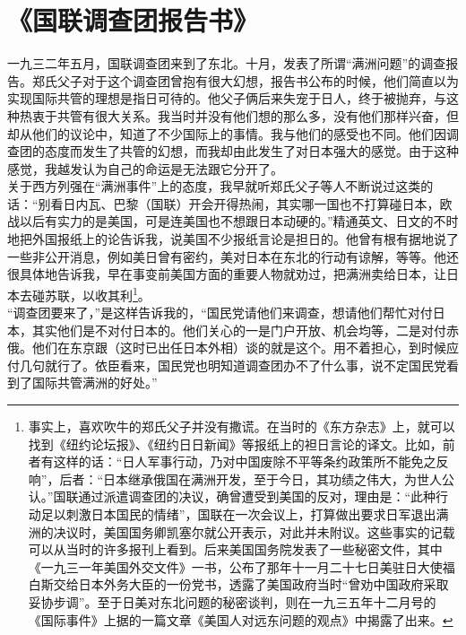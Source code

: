 \fancyhead[RO]{} %
\fancyhead[LE]{} %
\chapter*{《国联调查团报告书》}
\thispagestyle{empty}
一九三二年五月，国联调查团来到了东北。十月，发表了所谓“满洲问题”的调查报告。郑氏父子对于这个调查团曾抱有很大幻想，报告书公布的时候，他们简直以为实现国际共管的理想是指日可待的。他父子俩后来失宠于日人，终于被抛弃，与这种热衷于共管有很大关系。我当时并没有他们想的那么多，没有他们那样兴奋，但却从他们的议论中，知道了不少国际上的事情。我与他们的感受也不同。他们因调查团的态度而发生了共管的幻想，而我却由此发生了对日本强大的感觉。由于这种感觉，我越发认为自己的命运是无法跟它分开了。\\

关于西方列强在“满洲事件”上的态度，我早就听郑氏父子等人不断说过这类的话：“别看日内瓦、巴黎（国联）开会开得热闹，其实哪一国也不打算碰日本，欧战以后有实力的是美国，可是连美国也不想跟日本动硬的。”精通英文、日文的不时地把外国报纸上的论告诉我，说美国不少报纸言论是担日的。他曾有根有据地说了一些非公开消息，例如美日曾有密约，美对日本在东北的行动有谅解，等等。他还很具体地告诉我，早在事变前美国方面的重要人物就劝过，把满洲卖给日本，让日本去碰苏联，以收其利\footnote{事实上，喜欢吹牛的郑氏父子并没有撒谎。在当时的《东方杂志》上，就可以找到《纽约论坛报》、《纽约日日新闻》等报纸上的袒日言论的译文。比如，前者有这样的话：“日人军事行动，乃对中国废除不平等条约政策所不能免之反响”，后者：“日本继承俄国在满洲开发，至于今日，其功绩之伟大，为世人公认。”国联通过派遣调查团的决议，确曾遭受到美国的反对，理由是：“此种行动足以刺激日本国民的情绪”，国联在一次会议上，打算做出要求日军退出满洲的决议时，美国国务卿凯塞尔就公开表示，对此并未附议。这些事实的记载可以从当时的许多报刊上看到。后来美国国务院发表了一些秘密文件，其中《一九三一年美国外交文件》一书，公布了那年十一月二十七日美驻日大使福白斯交给日本外务大臣的一份党书，透露了美国政府当时“曾劝中国政府采取妥协步调”。至于日美对东北问题的秘密谈判，则在一九三五年十二月号的《国际事件》上据的一篇文章《美国人对远东问题的观点》中揭露了出来。}。\\

“调查团要来了，”是这样告诉我的，“国民党请他们来调查，想请他们帮忙对付日本，其实他们是不对付日本的。他们关心的一是门户开放、机会均等，二是对付赤俄。他们在东京跟（这时已出任日本外相）谈的就是这个。用不着担心，到时候应付几句就行了。依臣看来，国民党也明知道调查团办不了什么事，说不定国民党看到了国际共管满洲的好处。”\\

